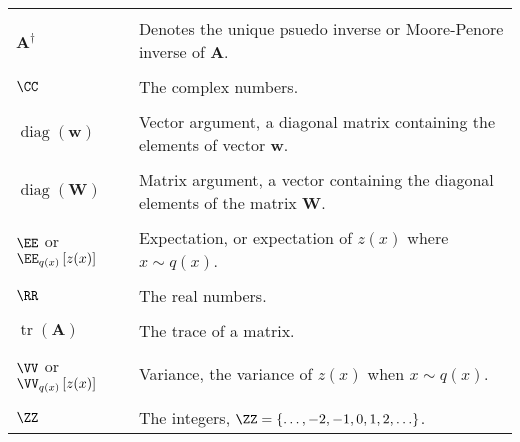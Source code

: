 \begin{longtable}{lp{}}
    \\\\
    $\bm{A}^{\dagger}$                                                                                         & Denotes the unique psuedo inverse or Moore-Penore inverse of $\bm{A}$.
    \\\\
    $\CC$                                                                                                      & The complex numbers.
    \\\\
    $\operatorname{diag} \left( \bm{w} \right)$                                                                & Vector argument, a diagonal matrix containing the elements of vector $\bm{w}$.
    \\\\
    $\operatorname{diag} \left( \bm{W} \right)$                                                                & Matrix argument, a vector containing the diagonal elements of the matrix $\bm{W}$.
    \\\\
    $\EE$ or $\EE_{q(x)} \left[ z(x) \right]$                                                                  & Expectation, or expectation of $z(x)$ where $x \sim q(x)$.
    \\\\
    $\RR$                                                                                                      & The real numbers.
    \\\\
    $\operatorname{tr} \left( \bm{A} \right)$                                                                  & The trace of a matrix.
    \\\\
    $\VV$ or $\VV_{q(x)} \left[ z(x) \right]$                                                                  & Variance, the variance of $z(x)$ when $x \sim q(x)$.
    \\\\
    $\ZZ$                                                                                                      & The integers, $\ZZ = \left\{ \ldots ,-2,-1,0,1,2,\ldots \right\}$.

    \\\bottomrule
    \hline
\end{longtable}
